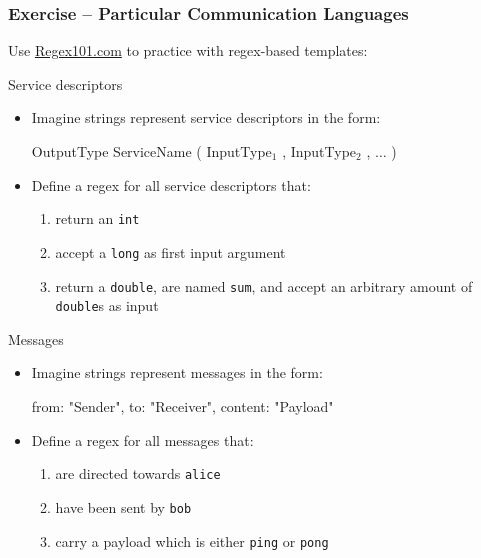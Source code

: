 \documentclass[presentation]{beamer}\mode<presentation>{\usetheme{AMSCesenaPurpleAndGold}}
\begin{document}
\begin{frame}[allowframebreaks]
	\frametitle{Exercise \currentExercise{} -- Particular Communication Languages}

	Use \href{https://regex101.com/}{Regex101.com} to practice with regex-based templates:

	\begin{block}{Service descriptors}
		\begin{itemize}
			\item Imagine strings represent \alert{service descriptors} in the form:
			\begin{center}\ttfamily\small
				OutputType ServiceName ( InputType$_1$ , InputType$_2$ , $\ldots$ )
			\end{center}

			\item Define a regex for all service descriptors that:
			\begin{enumerate}
				\item return an \texttt{int}
				\item accept a \texttt{long} as first input argument
				\item return a \texttt{double}, are named \texttt{sum}, and accept an arbitrary amount of \texttt{double}s as input
			\end{enumerate}
		\end{itemize}
	\end{block}

	\begin{block}{Messages}
		\begin{itemize}
			\item Imagine strings represent \alert{messages} in the form:
			\begin{center}\ttfamily\small
				from: "Sender", to: "Receiver", content: "Payload"
			\end{center}

			\item Define a regex for all messages that:
			\begin{enumerate}
				\item are directed towards \texttt{alice}
				\item have been sent by \texttt{bob}
				\item carry a payload which is either \texttt{ping} or \texttt{pong}
			\end{enumerate}
		\end{itemize}
	\end{block}

\end{frame}
\end{document}
